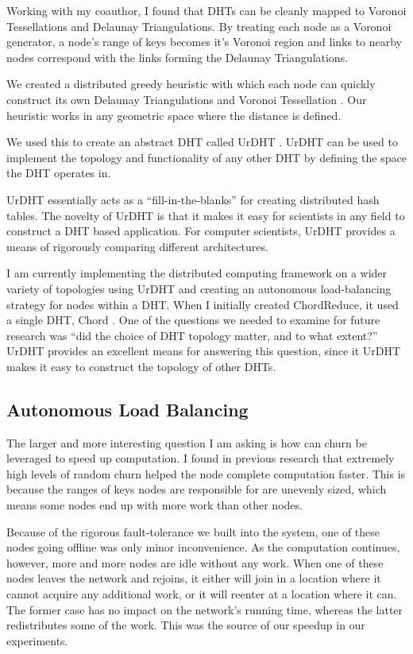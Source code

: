\documentclass[letterpaper]{article}
\begin{document}
Working with my coauthor, I found that DHTs can be cleanly mapped to Voronoi Tessellations and Delaunay Triangulations.
By treating each node as a Voronoi generator, a node's range of keys becomes it's Voronoi region
and links to nearby nodes correspond with the links forming the Delaunay Triangulations.

We created a distributed greedy heuristic with which each node can quickly construct its own Delaunay Triangulations and  Voronoi Tessellation \cite{dgvh}.
Our heuristic works in any geometric space where the distance is defined.

We used this to create an abstract DHT called UrDHT \cite{urdht}.
UrDHT can be used to implement the topology and functionality  of any other DHT by defining the space the DHT operates in.

UrDHT essentially acts as a ``fill-in-the-blanks'' for creating  distributed hash tables.
The novelty of UrDHT is that it makes it easy for scientists in any field to construct a DHT based application.
For computer scientists, UrDHT provides a means of rigorously comparing different architectures.

I am currently implementing the distributed computing framework on a wider variety of topologies using UrDHT and creating an autonomous load-balancing strategy for nodes within a DHT.
When I initially created ChordReduce, it used a single DHT, Chord \cite{chord}.
One of the questions we needed to examine for future research was ``did the choice of DHT topology matter, and to what extent?''
UrDHT provides an excellent means for answering this question, since it UrDHT makes it easy to construct the topology of other DHTs.


\subsection{Autonomous Load Balancing}
The larger and more interesting question I am asking is how can churn be leveraged to speed up computation.
I found in previous research that extremely high levels of random churn helped the node complete computation faster.
This is because the ranges of keys nodes are responsible for are unevenly sized, which means some nodes end up with more work than other nodes.

Because of the rigorous fault-tolerance we built into the system, one of these nodes going offline was only minor inconvenience.
As the computation continues, however, more and more nodes are idle without any work.
When one of these nodes leaves the network and rejoins, it either will join in a location where it cannot acquire any additional work, or it will reenter at a location where it can.
The former case has no impact on the network's running time, whereas the latter redistributes some of the work.
This was the source of our speedup in our experiments.
\end{document}
